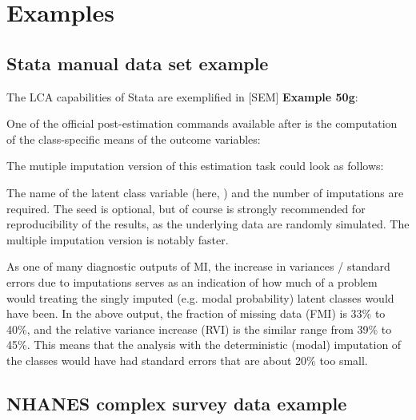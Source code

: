 \section{Examples}

\subsection{Stata manual data set example}

The LCA capabilities of Stata are exemplified in [SEM] \textbf{Example 50g}:

\begin{stlog}
\nullskip
\end{stlog}

One of the official post-estimation commands available after
 is the computation of the class-specific means
of the outcome variables:

\begin{stlog}
\nullskip
\end{stlog}

The mutiple imputation version of this estimation task could
look as follows:

\begin{stlog}
\nullskip
\end{stlog}

The name of the latent class variable (here, )
and the number of imputations are required. The seed is optional,
but of course is strongly recommended for reproducibility of the results,
as the underlying data are randomly simulated.
The multiple imputation version is notably faster.

As one of many diagnostic outputs of MI, the increase in variances / standard errors
due to imputations serves as an indication of how much of a problem
would treating the singly imputed (e.g. modal probability) latent classes would have been.
In the above output, the fraction of missing data (FMI)
is 33\% to 40\%, and the relative variance increase (RVI) is the similar range 
from 39\% to 45\%. This means that the analysis with the deterministic
(modal) imputation of the classes would have had standard errors 
that are about 20\% too small.

\begin{stlog}
\nullskip
\end{stlog}


\subsection{NHANES complex survey data example}

